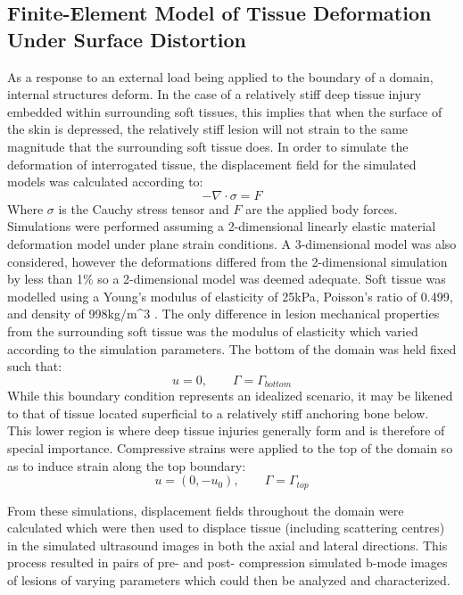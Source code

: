 		\subsection{Finite-Element Model of Tissue Deformation Under Surface Distortion}
			As a response to an external load being applied to the boundary of a domain, internal structures deform. In the case of a relatively stiff deep tissue injury embedded within surrounding soft tissues, this implies that when the surface of the skin is depressed, the relatively stiff lesion will not strain to the same magnitude that the surrounding soft tissue does. In order to simulate the deformation of interrogated tissue, the displacement field for the simulated models was calculated according to:
			\begin{equation}
				- {\nabla} \cdot \sigma = {F}
			\end{equation}
			Where $\sigma$ is the Cauchy stress tensor and $F$ are the applied body forces. Simulations were performed assuming a 2-dimensional linearly elastic material deformation model under plane strain conditions. A 3-dimensional model was also considered, however the deformations differed from the 2-dimensional simulation by less than \unit{1}{\%} so a 2-dimensional model was deemed adequate. Soft tissue was modelled using a Young's modulus of elasticity of \unit{25}{kPa}, Poisson's ratio of 0.499, and density of \unit{998}{kg/m^3} \cite{krouskop98, choi05, martin94}. The only difference in lesion mechanical properties from the surrounding soft tissue was the modulus of elasticity which varied according to the simulation parameters. The bottom of the domain was held fixed such that:
			\begin{equation}
				{u} = 0, \qquad \Gamma = \Gamma_{bottom}
			\end{equation}
			While this boundary condition represents an idealized scenario, it may be likened to that of tissue located superficial to a relatively stiff anchoring bone below. This lower region is where deep tissue injuries generally form and is therefore of special importance. Compressive strains were applied to the top of the domain so as to induce strain along the top boundary:
			\begin{equation}
				{u} = (0, -u_0), \qquad \Gamma = \Gamma_{top}
			\end{equation}

			From these simulations, displacement fields throughout the domain were calculated which were then used to displace tissue (including scattering centres) in the simulated ultrasound images in both the axial and lateral directions. This process resulted in pairs of pre- and post- compression simulated b-mode images of lesions of varying parameters which could then be analyzed and characterized.

